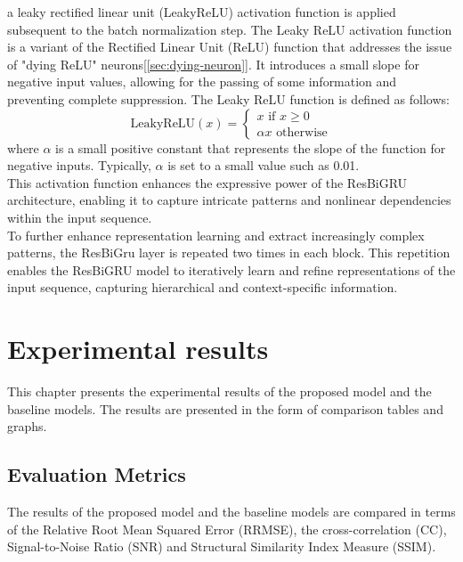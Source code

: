 \documentclass[a4paper, noexaminfo]{sapthesis}
\begin{document}
a leaky rectified linear unit (LeakyReLU) activation function is applied 
subsequent to the batch normalization step. The Leaky ReLU activation 
function is a variant of the Rectified Linear Unit (ReLU) function 
that addresses the issue of "dying ReLU" neurons[\ref{sec:dying-neuron}]. It introduces a 
small slope for negative input values, allowing for the passing of 
some information and preventing complete suppression. The Leaky ReLU 
function is defined as follows:
  \[
    \text{LeakyReLU}(x) =
  \begin{cases}
   x \text{ if } x \geq 0 \\
  \alpha x \text{ otherwise}
  \end{cases}
  \]
where \( \alpha \) is a small positive constant that represents 
the slope of the function for negative inputs. Typically, 
\( \alpha \) is set to a small value such as 0.01. \newline \\
This activation function 
enhances the expressive power of the ResBiGRU architecture, enabling 
it to capture intricate patterns and nonlinear dependencies within the 
input sequence.\newline \\
To further enhance representation learning and extract increasingly 
complex patterns, the ResBiGru layer is repeated two times in each block. This 
repetition enables the ResBiGRU model to iteratively learn and refine 
representations of the input sequence, capturing hierarchical and 
context-specific information. \newline

\chapter{Experimental results}
This chapter presents the experimental results of the proposed model and
the baseline models. The results are presented in the form of comparison tables
and graphs. 
\section{Evaluation Metrics}
The results of the proposed model and the baseline models are compared 
in terms of the Relative Root Mean Squared Error (RRMSE), the cross-correlation (CC),
Signal-to-Noise Ratio (SNR) and Structural Similarity Index Measure (SSIM).
\end{document}
